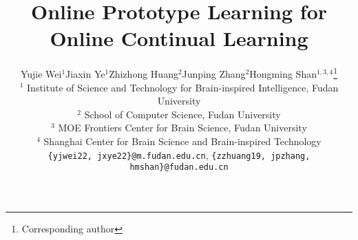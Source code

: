 \documentclass[10pt,twocolumn,letterpaper]{article}
\begin{document}
\title{Online Prototype Learning for Online Continual Learning}


\author{Yujie Wei$^{1}$\qquad Jiaxin Ye$^{1}$\qquad Zhizhong Huang$^{2}$\qquad Junping Zhang$^{2}$\qquad Hongming Shan$^{1,3,4}$\thanks{Corresponding author}
\\
$^{1}$ Institute of Science and Technology for Brain-inspired Intelligence, Fudan University\\
$^{2}$ School of Computer Science,
Fudan University\\
$^{3}$ MOE Frontiers Center for Brain Science, Fudan University\\
$^{4}$ Shanghai Center for Brain Science and Brain-inspired Technology\\
{\tt\small \{yjwei22, jxye22\}@m.fudan.edu.cn},\quad
{\tt\small \{zzhuang19, jpzhang, hmshan\}@fudan.edu.cn}
}

\maketitle
\ificcvfinal\thispagestyle{empty}\fi









\end{document}
